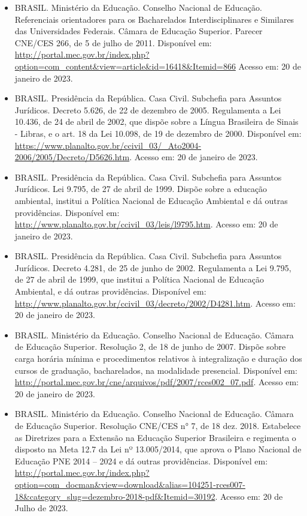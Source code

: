 \begin{itemize}
    \item BRASIL. Ministério da Educação. Conselho Nacional de Educação.
    Referenciais orientadores para os Bacharelados Interdisciplinares e
    Similares das Universidades Federais. Câmara de Educação Superior. Parecer
    CNE/CES 266, de 5 de julho de 2011.
    Disponível em:
    \url{http://portal.mec.gov.br/index.php?option=com_content&view=article&id=16418&Itemid=866}
    Acesso em: 20 de janeiro de 2023.
    
    \item BRASIL. Presidência da República. Casa Civil. Subchefia para Assuntos
    Jurídicos. Decreto 5.626, de 22 de dezembro de 2005. Regulamenta a Lei
    10.436, de 24 de abril de 2002, que dispõe sobre a Língua Brasileira de
    Sinais - Libras, e o art. 18 da Lei 10.098, de 19 de dezembro de 2000.
    Disponível em: \url{https://www.planalto.gov.br/ccivil_03/_Ato2004-2006/2005/Decreto/D5626.htm}.
    Acesso em: 20 de janeiro de 2023.
    
    \item  BRASIL. Presidência da República. Casa Civil. Subchefia para
    Assuntos Jurídicos. Lei 9.795, de 27 de abril de 1999. Dispõe sobre a
    educação ambiental, institui a Política Nacional de Educação Ambiental e dá
    outras providências. 
    Disponível em: \url{http://www.planalto.gov.br/ccivil_03/leis/l9795.htm}.
    Acesso em: 20 de janeiro de 2023.
    
    \item BRASIL. Presidência da República. Casa Civil. Subchefia para Assuntos
    Jurídicos. Decreto 4.281, de 25 de junho de 2002. Regulamenta a Lei 9.795,
    de 27 de abril de 1999, que institui a Política Nacional de Educação
    Ambiental, e dá outras providências. 
    Disponível em: \url{http://www.planalto.gov.br/ccivil_03/decreto/2002/D4281.htm}.
    Acesso em: 20 de janeiro de 2023.
    
    \item BRASIL. Ministério da Educação. Conselho Nacional de Educação. Câmara
    de Educação Superior. Resolução 2, de 18 de junho de 2007. Dispõe sobre
    carga horária mínima e procedimentos relativos à integralização e duração
    dos cursos de graduação, bacharelados, na modalidade presencial. 
    Disponível em: \url{http://portal.mec.gov.br/cne/arquivos/pdf/2007/rces002_07.pdf}.
    Acesso em: 20 de janeiro de 2023.

  \item BRASIL. Ministério da Educação. Conselho Nacional de
    Educação. Câmara de Educação Superior. Resolução CNE/CES n° 7, de
    18 dez. 2018. Estabelece as Diretrizes para a Extensão na Educação
    Superior Brasileira e regimenta o disposto na Meta 12.7 da Lei nº
    13.005/2014, que aprova o Plano Nacional de Educação PNE 2014 –
    2024 e dá outras providências. Disponível em:\\
    \href{http://portal.mec.gov.br/index.php?option=com_docman&view=download&alias=104251-rces007-18&category_slug=dezembro-2018-pdf&Itemid=30192}{http://portal.mec.gov.br/index.php?option=com\_docman\&view=download\&alias=104251-rces007-18\&category\_slug=dezembro-2018-pdf\&Itemid=30192}.
    Acesso em: 20 de Julho de 2023.
    

\end{itemize}

